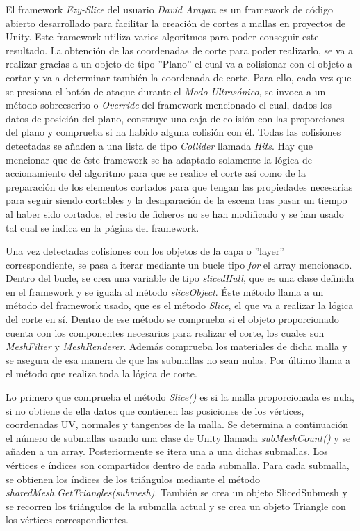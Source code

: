 El framework \textit{Ezy-Slice} del usuario \textit{David Arayan} \cite{ezySlice} es un framework de código abierto desarrollado para facilitar la creación de cortes a mallas en proyectos de Unity. Este framework utiliza varios algoritmos para poder conseguir este resultado. La obtención de las coordenadas de corte para poder realizarlo, se va a realizar gracias a un objeto de tipo ''Plano'' el cual va a colisionar con el objeto a cortar y va a determinar también la coordenada de corte. Para ello, cada vez que se presiona el botón de ataque durante el \textit{Modo Ultrasónico}, se invoca a un método sobreescrito o \textit{Override} del framework mencionado el cual, dados los datos de posición del plano, construye una caja de colisión con las proporciones del plano y comprueba si ha habido alguna colisión con él. Todas las colisiones detectadas se añaden a una lista de tipo \textit{Collider} llamada \textit{Hits}. Hay que mencionar que de éste framework se ha adaptado solamente la lógica de accionamiento del algoritmo para que se realice el corte así como de la preparación de los elementos cortados para que tengan las propiedades necesarias para seguir siendo cortables y la desaparación de la escena tras pasar un tiempo al haber sido cortados, el resto de ficheros no se han modificado y se han usado tal cual se indica en la página del framework. 

Una vez detectadas colisiones con los objetos de la capa o ''layer'' correspondiente, se pasa a iterar mediante un bucle tipo \textit{for} el array mencionado. Dentro del bucle, se crea una variable de tipo \textit{slicedHull}, que es una clase definida en el framework y se iguala al método \textit{sliceObject}. Éste método llama a un método del framework usado, que es el método \textit{Slice}, el que va a realizar la lógica del corte en sí. Dentro de ese método se comprueba si el objeto proporcionado cuenta con los componentes necesarios para realizar el corte, los cuales son \textit{MeshFilter} y \textit{MeshRenderer}. Además comprueba los materiales de dicha malla y se asegura de esa manera de que las submallas no sean nulas. Por último llama a el método que realiza toda la lógica de corte.

Lo primero que comprueba el método \textit{Slice()} es si la malla proporcionada es nula, si no obtiene de ella datos que contienen las posiciones de los vértices, coordenadas UV, normales y tangentes de la malla. Se determina a continuación el número  de submallas usando una clase de Unity llamada \textit{subMeshCount()} y se añaden a un array. Posteriormente se itera una a una dichas submallas. Los vértices e índices son compartidos dentro de cada submalla. Para cada submalla, se obtienen los índices de los triángulos mediante el método \textit{sharedMesh.GetTriangles(submesh)}. También se crea un objeto SlicedSubmesh y se recorren los triángulos de la submalla actual y se crea un objeto Triangle con los vértices correspondientes.

